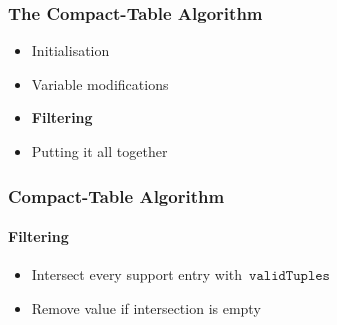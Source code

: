 \documentclass{beamer}
\newcommand{\CurrTable}{\texttt{validTuples}}
\begin{document}
\begin{frame}
  \frametitle{The Compact-Table Algorithm}
  \begin{itemize}
  \item {\color{gray}Initialisation}
  \item {\color{gray}Variable modifications}
  \item \textbf{Filtering}
  \item {\color{gray}Putting it all together}
  \end{itemize}
\end{frame}

\begin{frame}
  \frametitle{Compact-Table Algorithm}
  \framesubtitle{Filtering}
    
  \begin{itemize}
    \item Intersect every support entry with~$\CurrTable$
    \item Remove value if intersection is empty
  \end{itemize}
  
  \bigskip


\end{frame}
\end{document}
